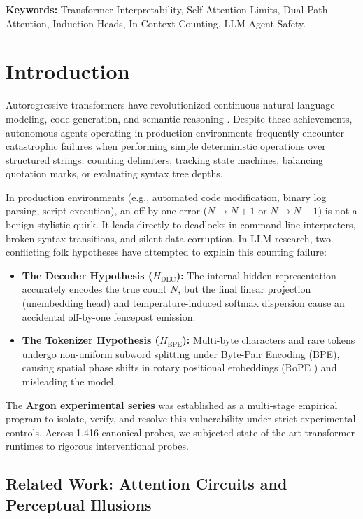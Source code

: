 \documentclass[11pt,a4paper]{article}
\begin{document}
\vspace{1em}
\noindent\textbf{Keywords:} Transformer Interpretability, Self-Attention Limits, Dual-Path Attention, Induction Heads, In-Context Counting, LLM Agent Safety.

\newpage

\section{Introduction}

Autoregressive transformers have revolutionized continuous natural language modeling, code generation, and semantic reasoning \cite{vaswani2017attention}. Despite these achievements, autonomous agents operating in production environments frequently encounter catastrophic failures when performing simple deterministic operations over structured strings: counting delimiters, tracking state machines, balancing quotation marks, or evaluating syntax tree depths.

In production environments (e.g., automated code modification, binary log parsing, script execution), an off-by-one error ($N \to N+1$ or $N \to N-1$) is not a benign stylistic quirk. It leads directly to deadlocks in command-line interpreters, broken syntax transitions, and silent data corruption. In LLM research, two conflicting folk hypotheses have attempted to explain this counting failure:
\begin{itemize}
    \item \textbf{The Decoder Hypothesis ($H_{\text{DEC}}$):} The internal hidden representation accurately encodes the true count $N$, but the final linear projection (unembedding head) and temperature-induced softmax dispersion cause an accidental off-by-one fencepost emission.
    \item \textbf{The Tokenizer Hypothesis ($H_{\text{BPE}}$):} Multi-byte characters and rare tokens undergo non-uniform subword splitting under Byte-Pair Encoding (BPE), causing spatial phase shifts in rotary positional embeddings (RoPE \cite{su2024roformer}) and misleading the model.
\end{itemize}

The \textbf{Argon experimental series} was established as a multi-stage empirical program to isolate, verify, and resolve this vulnerability under strict experimental controls. Across 1,416 canonical probes, we subjected state-of-the-art transformer runtimes to rigorous interventional probes.

\subsection{Related Work: Attention Circuits and Perceptual Illusions}
\end{document}
